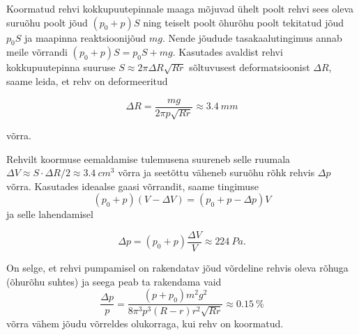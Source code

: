 {\ifSolution
Koormatud rehvi kokkupuutepinnale maaga mõjuvad ühelt poolt rehvi sees oleva suruõhu poolt jõud $\left(p_{0}+p\right)S$ ning teiselt
poolt õhurõhu poolt tekitatud jõud $p_{0}S$ ja maapinna reaktsioonijõud $mg$. Nende jõudude tasakaalutingimus annab meile võrrandi $\left(p_{0}+p\right)S=p_{0}S+mg.$ Kasutades avaldist rehvi kokkupuutepinna suuruse $S\approx2\pi\Delta R\sqrt{Rr}$ sõltuvusest deformatsioonist $\Delta R$, saame leida, et rehv on deformeeritud

\begin{equation}
\Delta R=\frac{mg}{2\pi p\sqrt{Rr}}\approx\SI{3.4}{mm}
\end{equation}

\noindent võrra.

Rehvilt koormuse eemaldamise tulemusena suureneb selle ruumala $\Delta V\approx S\cdot\Delta R/2\approx\SI{3.4}{cm^{3}}$ võrra ja seetõttu väheneb suruõhu rõhk rehvis $\Delta p$ võrra. Kasutades ideaalse gaasi võrrandit, saame tingimuse
\[
\left(p_{0}+p\right)\left(V-\Delta V\right)=\left(p_{0}+p-\Delta p\right)V
\]
ja selle lahendamisel

\begin{equation}
\Delta p=\left(p_{0}+p\right)\frac{\Delta V}{V}\approx\SI{224}{Pa}.
\end{equation}

On selge, et rehvi pumpamisel on rakendatav jõud võrdeline rehvis oleva rõhuga (õhurõhu suhtes) ja seega peab ta rakendama vaid 
\[
\frac{\Delta p}{p}=\frac{\left(p+p_{0}\right)m^{2}g^{2}}{8\pi^{3}p^{3}\left(R-r\right)r^{2}\sqrt{Rr}}\approx\SI{0.15}{\percent}
\]
võrra vähem jõudu võrreldes olukorraga, kui rehv on koormatud.
\fi


}
